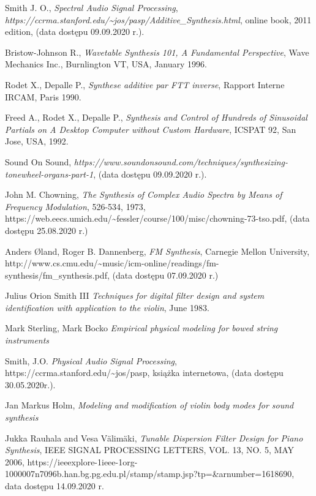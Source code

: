 \documentclass[nostrict]{szablonPG}
\begin{document}
\begin{thebibliography}{20}
		Smith J. O., \emph{Spectral Audio Signal Processing}, \emph{https://ccrma.stanford.edu/\textasciitilde jos/pasp/Additive\_Synthesis.html}, online book, 2011 edition, (data dostępu 09.09.2020 r.).
		
		Bristow-Johnson R., \emph{Wavetable Synthesis 101, A Fundamental Perspective}, Wave Mechanics Inc., Burnlington VT, USA, January 1996.
		
		Rodet X., Depalle P., \emph{Synthese additive par FTT inverse}, Rapport Interne IRCAM, Paris 1990.
		
		Freed A., Rodet X., Depalle P., \emph{Synthesis and Control of Hundreds of Sinusoidal Partials on A Desktop Computer without Custom Hardware}, ICSPAT 92, San Jose, USA, 1992.
		
		Sound On Sound, \emph{https://www.soundonsound.com/techniques/synthesizing-tonewheel-organs-part-1}, (data dostępu 09.09.2020 r.).
		
		John M. Chowning, \emph{The Synthesis of Complex Audio Spectra by Means of Frequency Modulation}, 526-534, 1973, https://web.eecs.umich.edu/\textasciitilde fessler/course/100/misc/chowning-73-tso.pdf, (data dostępu 25.08.2020 r.)
		
		Anders Øland, Roger B. Dannenberg, \emph{FM Synthesis},	Carnegie Mellon University, http://www.cs.cmu.edu/\textasciitilde music/icm-online/readings/fm-synthesis/fm\_synthesis.pdf, (data dostępu 07.09.2020 r.)
		
		Julius Orion Smith III \emph{Techniques for digital filter design and system identification with application to the violin}, June 1983.
		
		Mark Sterling, Mark Bocko \emph{Empirical physical modeling for bowed string instruments}
		
		Smith, J.O. \emph{Physical Audio Signal Processing}, https://ccrma.stanford.edu/\textasciitilde jos/pasp, książka internetowa, (data dostępu 30.05.2020r.).
		
		Jan Markus Holm, \emph{Modeling and modification of violin body modes for sound synthesis}
			
		Jukka Rauhala and Vesa Välimäki, \emph{Tunable Dispersion Filter Design for Piano Synthesis}, IEEE SIGNAL PROCESSING LETTERS, VOL. 13, NO. 5, MAY 2006, https://ieeexplore-1ieee-1org-1000007n7096b.han.bg.pg.edu.pl/stamp/stamp.jsp?tp=\&arnumber=1618690, data dostępu 14.09.2020 r.
		

\end{thebibliography}
\end{document}
